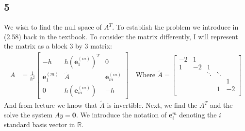 \documentclass[]{article}
\begin{document}
    \subsection*{5}
        We wish to find the null space of $A^T$. To establish the problem we introduce in (2.58) back in the textbook. To consider the matrix differently, I will represent the matrix as a block 3 by 3 matrix: 
        \begin{align*}\tag{5.1}\label{eqn:5.1}
            A &= \frac{1}{h^2} 
            \begin{bmatrix}
                -h & h(\mathbf{e}^{(m)}_1)^T & 0 \\
                \mathbf{e}_1^{(m)} & \tilde{A} & \mathbf{e}^{(m)}_m \\ 
                0 & h(\mathbf{e}_m^{(m)}) & - h
            \end{bmatrix} 
            \quad
            \text{Where } 
            \tilde{A} = \begin{bmatrix}
                -2 & 1  & & &  \\
                1 & -2 & 1 & &  \\
                & &\ddots &\ddots &  \\ 
                & & & & 1  \\ 
                & & &1 & -2 \\ 
            \end{bmatrix}
        \end{align*}
        And from lecture we know that $\tilde{A}$ is invertible. Next, we find the $A^T$ and the solve the system $Ay = \mathbf{0}$. We introduce the notation of $\mathbf{e}_i^{m}$ denoting the $i$ standard basis vector in $\mathbb{R}$. 
\end{document}
